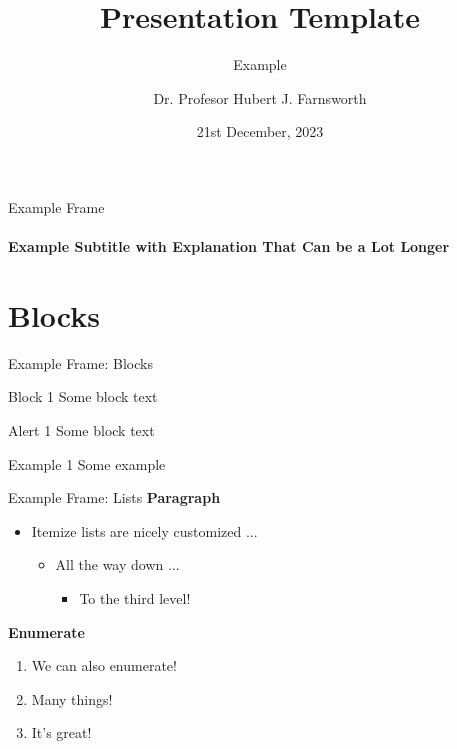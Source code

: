 \documentclass[aspectratio=43]{beamer}
\title{Presentation Template}
\subtitle{Example}
\author[H. J. F.]{Dr. Profesor Hubert J. Farnsworth}
\institute{West University of Timișoara}
\date{21st December, 2023}
\begin{document}
\titleframe

\begin{frame}{Example Frame}
\framesubtitle{Example Subtitle with Explanation That Can be a Lot Longer}
\end{frame}

\section{Blocks}

\begin{frame}{Example Frame: Blocks}
\begin{block}{Block 1}
Some block text
\end{block}

\begin{alertblock}{Alert 1}
Some block text
\end{alertblock}

\begin{exampleblock}{Example 1}
Some example
\end{exampleblock}
\end{frame}

\begin{frame}{Example Frame: Lists}
\small
\textbf{Paragraph}

\begin{itemize}
    \item Itemize lists are nicely customized ...
    \begin{itemize}
        \item All the way down ...
        \begin{itemize}
            \item To the third level!
        \end{itemize}
    \end{itemize}
\end{itemize}

\textbf{Enumerate}

\begin{enumerate}
    \item We can also enumerate!
    \item Many things!
    \item It's great!
\end{enumerate}
\end{frame}
\end{document}
